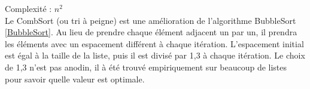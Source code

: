 \label{combSort}
\footnotesize 
\noindent
Complexité :  $ n^2$
\\
\normalsize
Le CombSort (ou tri à peigne) est une amélioration de l'algorithme BubbleSort \ref{BubbleSort}. Au lieu de prendre chaque élément adjacent un par un, il prendra les éléments avec un espacement différent à chaque itération. L'espacement initial est égal à la taille de la liste, puis il est divisé par 1,3 à chaque itération. Le choix de 1,3 n'est pas anodin, il à été trouvé empiriquement sur beaucoup de listes pour savoir quelle valeur est optimale.